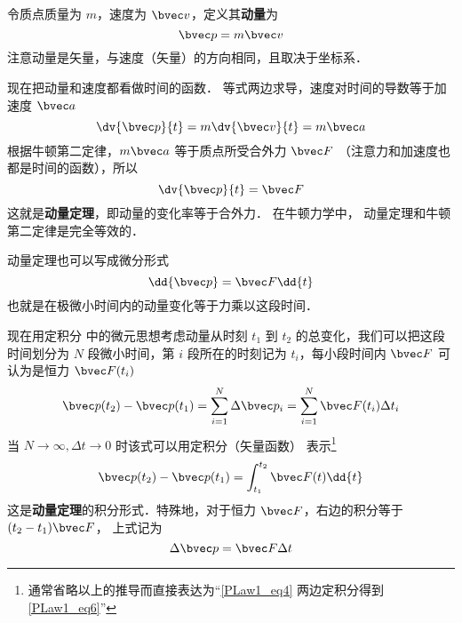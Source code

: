 

令质点质量为 $m$，速度为 $\bvec v$，定义其\textbf{动量}为
\begin{equation}
\bvec p = m\bvec v
\end{equation}
注意动量是矢量，与速度（矢量）的方向相同，且取决于坐标系．

现在把动量和速度都看做时间的函数． 等式两边求导，速度对时间的导数等于加速度 $\bvec a$
\begin{equation}
\dv{\bvec p}{t} = m \dv{\bvec v}{t} = m\bvec a
\end{equation}
根据牛顿第二定律，$m\bvec a$ 等于质点所受合外力 $\bvec F$ （注意力和加速度也都是时间的函数），所以
\begin{equation}
\dv{\bvec p}{t} = \bvec F
\end{equation}
这就是\textbf{动量定理}，即动量的变化率等于合外力． 在牛顿力学中， 动量定理和牛顿第二定律是完全等效的．

动量定理也可以写成微分形式
\begin{equation}\label{PLaw1_eq4}
\dd{\bvec p} = \bvec F \dd{t}
\end{equation}
也就是在极微小时间内的动量变化等于力乘以这段时间．

现在用定积分 中的微元思想考虑动量从时刻 $t_1$ 到 $t_2$ 的总变化，我们可以把这段时间划分为 $N$ 段微小时间，第 $i$ 段所在的时刻记为 $t_i$，每小段时间内 $\bvec F$ 可认为是恒力 $\bvec F(t_i)$
\begin{equation}
\bvec p(t_2)-\bvec p(t_1) = \sum_{i=1}^{N} \Delta\bvec p_i= \sum_{i=1}^{N} \bvec F(t_i) \Delta t_i
\end{equation}
当 $N\to\infty, \Delta t\to 0$ 时该式可以用定积分（矢量函数）%
表示\footnote{通常省略以上的推导而直接表达为“\autoref{PLaw1_eq4} 两边定积分得到\autoref{PLaw1_eq6}”}
\begin{equation}\label{PLaw1_eq6}
\bvec p(t_2)-\bvec p(t_1) = \int_{t_1}^{t_2}\bvec F(t) \dd{t}
\end{equation}
这是\textbf{动量定理}的积分形式．特殊地，对于恒力 $\bvec F$，右边的积分等于 $(t_2-t_1)\bvec F$， 上式记为
\begin{equation}
\Delta \bvec p = \bvec F \Delta t
\end{equation}
